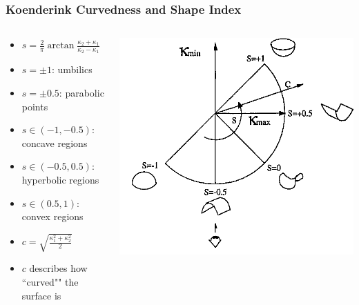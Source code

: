 \documentclass{beamer}
\begin{document}
\begin{frame}
\frametitle{Koenderink Curvedness and Shape Index}
\begin{columns}
\begin{column}{0.5\textwidth}
\begin{itemize}
    \item $s = \frac{2}{\pi}\arctan\frac{\kappa_2 + \kappa_1}{\kappa_2 - \kappa_1}$
    \item $s=\pm 1$: umbilics
    \item $s=\pm 0.5$: parabolic points
    \item $s\in(-1,-0.5)$: concave regions
    \item $s\in(-0.5,0.5)$: hyperbolic regions
    \item $s\in(0.5,1)$: convex regions
    \item $c = \sqrt{\frac{\kappa_1^2 + \kappa_2^2}{2}}$
    \item $c$ describes how ``curved"" the surface is
\end{itemize}
\end{column}
\begin{column}{0.5\textwidth} 
    \begin{center}
    \includegraphics[width=0.8\linewidth]{CandS.png}
    \end{center}
\end{column}
\end{columns}

\end{frame}
\end{document}

